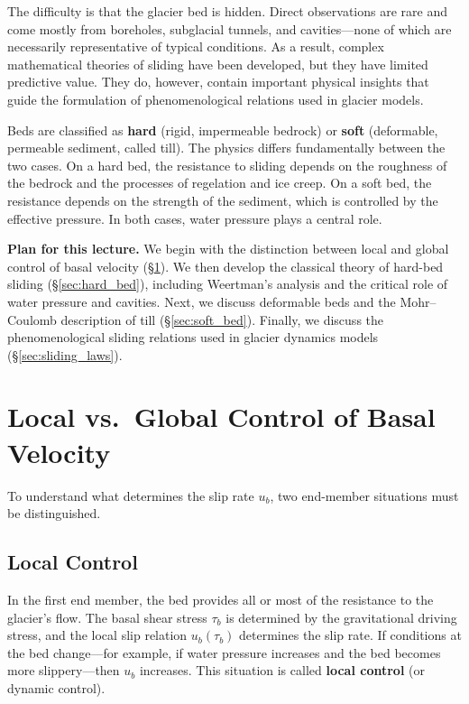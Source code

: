 \documentclass[11pt]{article}
\begin{document}
\medskip
\noindent The difficulty is that the glacier bed is hidden.  Direct observations are rare and come mostly from boreholes, subglacial tunnels, and cavities---none of which are necessarily representative of typical conditions.  As a result, complex mathematical theories of sliding have been developed, but they have limited predictive value.  They do, however, contain important physical insights that guide the formulation of phenomenological relations used in glacier models.

\medskip
\noindent Beds are classified as \textbf{hard} (rigid, impermeable bedrock) or \textbf{soft} (deformable, permeable sediment, called till).  The physics differs fundamentally between the two cases.  On a hard bed, the resistance to sliding depends on the roughness of the bedrock and the processes of regelation and ice creep.  On a soft bed, the resistance depends on the strength of the sediment, which is controlled by the effective pressure.  In both cases, water pressure plays a central role.

\medskip
\noindent\textbf{Plan for this lecture.}  We begin with the distinction between local and global control of basal velocity (\S\ref{sec:local_global}).  We then develop the classical theory of hard-bed sliding (\S\ref{sec:hard_bed}), including Weertman's analysis and the critical role of water pressure and cavities.  Next, we discuss deformable beds and the Mohr--Coulomb description of till (\S\ref{sec:soft_bed}).  Finally, we discuss the phenomenological sliding relations used in glacier dynamics models (\S\ref{sec:sliding_laws}).

\section{Local vs.\ Global Control of Basal Velocity}
\label{sec:local_global}

To understand what determines the slip rate $u_b$, two end-member situations must be distinguished.

\subsection{Local Control}

In the first end member, the bed provides all or most of the resistance to the glacier's flow.  The basal shear stress $\tau_b$ is determined by the gravitational driving stress, and the local slip relation $u_b(\tau_b)$ determines the slip rate.  If conditions at the bed change---for example, if water pressure increases and the bed becomes more slippery---then $u_b$ increases.  This situation is called \textbf{local control} (or dynamic control).
\end{document}
